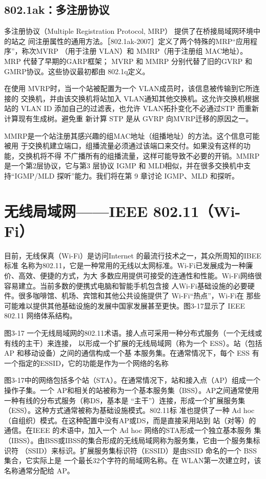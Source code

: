 \subsection{802.1ak：多注册协议}

多注册协议（Multiple Registration Protocol, MRP） 提供了在桥接局域网环境中的站之
间注册属性的通用方法。［802.1ak-2007］定义了两个特殊的MRP“应用程序”，称次MVRP
（用于注册 VLAN）和 MMRP（用于注册组 MAC地址）。MRP 代替了早期的GARP框架；
MVRP 和 MMRP 分别代替了旧的GVRP 和GMRP协议。这些协议最初都由 802.1q定义。

在使用 MVRP时，当一个站被配置为一个 VLAN成员时，该信息被传输到它所连接的
交换机，并由该交换机将站加入 VLAN通知其他交换机。这允许交换机根据站的 VLAN ID
添加自己的过滤表，也允许 VLAN拓扑变化不必通过STP 而重新计算现有生成树。避免重
新计算 STP 是从 GVRP 向MVRP迁移的原因之一。

MMRP是一个站注册其感兴趣的组MAC地址（组播地址）的方法。这个信息可能被用
于交换机建立端口，组播流量必须通过该端口来交付。如果没有这样的功能，交换机将不得
不广播所有的组播流量，这样可能导致不必要的开销。MMRP是一个第2层协议，它与第3
层协议 IGMP 和 MLD相似，并在很多交换机中支持“IGMP/MLD 探听”能力。我们将在第
9 章讨论 IGMP、MLD 和探听。

\section{无线局域网——IEEE 802.11（Wi-Fi）}

目前，无线保真（Wi-Fi）是访问Internet 的最流行技术之一，其众所周知的IBEE 标准
名称为802.11，它是一种常用的无线以太网标准。Wi-Fi已发展成为一种廉价、高效、便捷的方式，为大
多数应用提供可接受的连通性和性能。Wi-Fi网络很容易建立。当前多数的便携式电脑和智能手机包含接
人Wi-Fi基础设施的必要硬件。很多咖啡馆、机场、宾馆和其他公共设施提供了 Wi-Fi“热点”，Wi-Fi在
那些可能难以提供其他基础设施的发展中国家发展甚至更快。图3-17显示了 IEEE 802.11 网络体系结构。

图3-17 一个无线局域网的802.11术语。接人点可采用一种分布式服务（一个无线或有线的主干）来连接，
以形成一个扩展的无线局域网（称为一个 ESS）。站（包括AP 和移动设备）之间的通信构成一个基
本服务集。在通常情况下，每个 ESS 有一个指定的ESSID，它的功能是作为一个网络的名称

图3-17中的网络包括多个站（STA）。在通常情况下，站和接入点（AP）组成一个操作子集。一个
AP和相关的站被称为一个基本服务集（BSS）。AP之间通常使用一种有线的分布式服务（称DS，基本是
“主干”）连接，形成一个扩展服务集（ESS）。这种方式通常被称为基础设施模式。802.11标
准也提供了一种 Ad hoc（自组织）模式。在这种配置中没有AP或DS，而是直接采用站到
站（对等）的通信。在IEEE 的术语中，加入一个 Ad hoc 网络的STA形成一个独立基本服务
集（IBSS）。由BSS或IBSS的集合形成的无线局域网称为服务集，它由一个服务集标识符
（SSID）来标识。扩展服务集标识符（ESSID）是由SSID 命名的一个 BSS集合，它实际上是
一个最长32个字符的局域网名称。在 WLAN第一次建立时，该名称通常分配给 AP。

